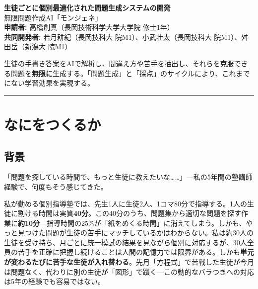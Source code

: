 \documentclass[paper=a4,fontsize=10.5bp,jafontsize=10.5bp]{jlreq}
\begin{document}
\noindent
\begin{minipage}[t]{0.62\textwidth}
\vspace{0pt}
{\large\sffamily\bfseries\color{mainblue} 生徒ごとに個別最適化された問題生成システムの開発}\\[2pt]
{\normalsize\sffamily\color{accentorange} 無限問題作成AI「モンジェネ」}\\[4pt]
{\small\sffamily
\textbf{申請者:} 高橋創真（長岡技術科学大学大学院 修士1年）\\
\textbf{共同開発者:} 若月耕紀（長岡技科大 院M1）、小武壮太（長岡技科大 院M1）、舛田岳（新潟大 院M1）
}
\end{minipage}
\hfill
\begin{minipage}[t]{0.35\textwidth}
\vspace{0pt}
\begin{tcolorbox}[colback=lightbg,colframe=mainblue,arc=2pt,boxrule=0.6pt,
  left=3pt,right=3pt,top=2pt,bottom=2pt]
\small\sffamily
生徒の手書き答案をAIで解析し、間違え方や苦手を抽出し、それらを克服できる問題を\textbf{無限に}生成する。「問題生成」と「採点」のサイクルにより、これまでにない学習効果を実現する。
\end{tcolorbox}
\end{minipage}


{\color{mainblue}\rule{\textwidth}{1.2pt}}


\section{なにをつくるか}

\subsection{背景}

「問題を探している時間で、もっと生徒に教えたいな……」---私の5年間の塾講師経験で、何度もそう感じてきた。

私が勤める個別指導塾では、先生1人に生徒2人、1コマ80分で指導する。1人の生徒に割ける時間は実質\textbf{40分}。この40分のうち、問題集から適切な問題を探す作業に\textbf{約10分}---指導時間の25\%が「紙をめくる時間」に消えてしまう。しかも、やっと見つけた問題が生徒の苦手にマッチしているかはわからない。私は約30人の生徒を受け持ち、月ごとに統一模試の結果を見ながら個別に対応するが、30人全員の苦手を正確に把握し続けることは人間の記憶力では限界がある。しかも\textbf{単元が変わるたびに苦手な生徒が入れ替わる}。先月「方程式」で苦戦した生徒が今月は問題なく、代わりに別の生徒が「図形」で躓く---この動的なバラつきへの対応は5年の経験でも容易ではない。
\end{document}

